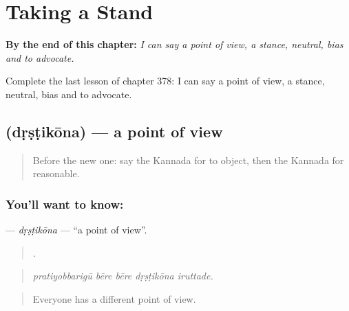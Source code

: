 
\chapter{Taking a Stand}
\label{ch:ka-taking-a-stand}

\begin{chapteropening}
\textbf{By the end of this chapter:} \emph{I can say a point of view, a stance, neutral, bias and to advocate.}

Complete the last lesson of chapter 378: I can say a point of view, a stance, neutral, bias and to advocate.
\end{chapteropening}

\section[\texorpdfstring{\kn{ದೃಷ್ಟಿಕೋನ} (dṛṣṭikōna)}{ದೃಷ್ಟಿಕೋನ (dṛṣṭikōna)}]{ (dṛṣṭikōna) — a point of view}

\label{lesson:KA-C378-drstikona}



\begin{quote}
Before the new one: say the Kannada for to object, then the Kannada for reasonable.
\end{quote}

\subsection*{You'll want to know: }
\textbf{} — \emph{dṛṣṭikōna} — \textquotedblleft{}a point of view\textquotedblright{}.

\begin{quote}
    .
\end{quote}

\begin{quote}
\emph{pratiyobbarigū bēre bēre dṛṣṭikōna iruttade.}
\end{quote}

\begin{quote}
Everyone has a different point of view.
\end{quote}

